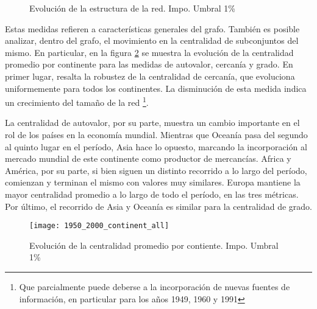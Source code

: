 \documentclass[class=article, crop=false]{standalone}
\begin{document}
\begin{figure}[h!]
	\centering
	\caption{Evolución de la estructura de la red. Impo. Umbral 1\%}
	\label{fig:metricas_LP}
\end{figure}

Estas medidas refieren a características generales del grafo. También es posible analizar, dentro del grafo, el movimiento en la centralidad de subconjuntos del mismo. En particular, en la figura  \ref{fig:centralidad_LP} se muestra la evolución de la centralidad promedio por continente para las medidas de autovalor, cercanía y grado. En primer lugar, resalta la robustez de la centralidad de cercanía, que evoluciona uniformemente para todos los continentes. La disminución de esta medida indica un crecimiento del tamaño de la red \footnote{ Que parcialmente puede deberse a la incorporación de nuevas fuentes de información, en particular para los años 1949, 1960 y 1991}. \par
La centralidad de autovalor, por su parte, muestra un cambio importante en el rol de los países en la economía mundial. Mientras que Oceanía pasa del segundo al quinto lugar en el período, Asia hace lo opuesto, marcando la incorporación al mercado mundial de este continente como productor de mercancías.  Africa y América, por su parte, si bien siguen un distinto recorrido a lo largo del período, comienzan y terminan el mismo con valores muy similares. Europa mantiene la mayor centralidad promedio a lo largo de todo el período, en las tres métricas. Por último, el recorrido de Asia y Oceanía es similar para la centralidad de grado.

\begin{figure}[h!]
	\centering		\texttt{[image: 1950\_2000\_continent\_all]}
	\caption{Evolución de la centralidad promedio por contiente. Impo. Umbral 1\%}
	\label{fig:centralidad_LP}
\end{figure}
\end{document}
